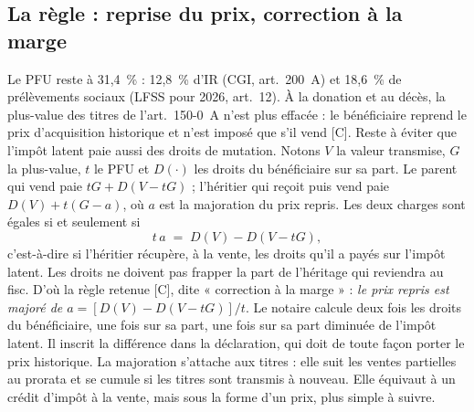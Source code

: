 
\subsection{La règle : reprise du prix, correction à la marge}

Le PFU reste à 31,4~\% : 12,8~\% d'IR (CGI, art.~200~A) et 18,6~\% de prélèvements sociaux (LFSS pour 2026,
art.~12). À la donation et au décès, la plus-value des titres de l'art.~150-0~A n'est plus effacée : le bénéficiaire
reprend le prix d'acquisition historique et n'est imposé que s'il vend [C]. Reste à éviter que l'impôt latent paie
aussi des droits de mutation. Notons $V$ la valeur transmise, $G$ la plus-value, $t$ le PFU et $D(\cdot)$ les droits
du bénéficiaire sur sa part. Le parent qui vend paie $tG + D(V-tG)$ ; l'héritier qui reçoit puis vend paie $D(V) +
t(G-a)$, où $a$ est la majoration du prix repris. Les deux charges sont égales si et seulement si
\[
t\,a \;=\; D(V) - D(V - tG),
\]
c'est-à-dire si l'héritier récupère, à la vente, les droits qu'il a payés sur l'impôt latent. Les droits ne doivent
pas frapper la part de l'héritage qui reviendra au fisc. D'où la règle retenue [C], dite « correction à la marge » :
\emph{le prix repris est majoré de $a = [D(V) - D(V - tG)]/t$}. Le notaire calcule deux fois les droits du bénéficiaire,
une fois sur sa part, une fois sur sa part diminuée de l'impôt latent. Il inscrit la différence dans la déclaration,
qui doit de toute façon porter le prix historique. La majoration s'attache aux titres : elle suit les ventes
partielles au prorata et se cumule si les titres sont transmis à nouveau. Elle équivaut à un crédit d'impôt à la vente,
mais sous la forme d'un prix, plus simple à suivre.

